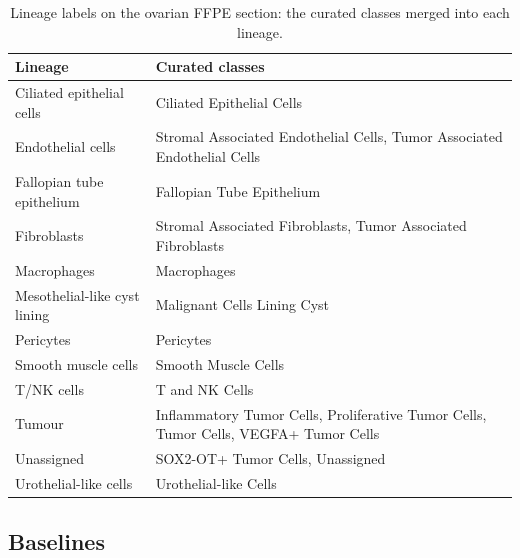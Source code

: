 \begin{table}[t]
\centering
\caption{Lineage labels on the ovarian FFPE section: the curated classes merged into each lineage.}
\label{tab:lineage-ovarian}
\small
\begin{tabular}{@{}>{\raggedright\arraybackslash}p{}>{\raggedright\arraybackslash}p{}@{}}
\toprule
Lineage & Curated classes \\
\midrule
Ciliated epithelial cells & Ciliated Epithelial Cells \\
Endothelial cells & Stromal Associated Endothelial Cells, Tumor Associated Endothelial Cells \\
Fallopian tube epithelium & Fallopian Tube Epithelium \\
Fibroblasts & Stromal Associated Fibroblasts, Tumor Associated Fibroblasts \\
Macrophages & Macrophages \\
Mesothelial-like cyst lining & Malignant Cells Lining Cyst \\
Pericytes & Pericytes \\
Smooth muscle cells & Smooth Muscle Cells \\
T/NK cells & T and NK Cells \\
Tumour & Inflammatory Tumor Cells, Proliferative Tumor Cells, Tumor Cells, VEGFA+ Tumor Cells \\
Unassigned & SOX2-OT+ Tumor Cells, Unassigned \\
Urothelial-like cells & Urothelial-like Cells \\
\bottomrule
\end{tabular}
\end{table}


\subsection{Baselines}
\label{app:baselines}

